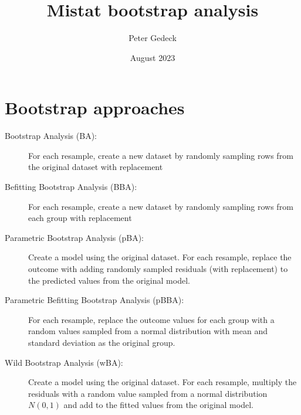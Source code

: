 \documentclass{article}
\title{Mistat bootstrap analysis}
\author{Peter Gedeck}
\date{August 2023}
\begin{document}
\maketitle

\section{Bootstrap approaches}
\begin{description}
    \item[Bootstrap Analysis (BA):] For each resample, create a new dataset by randomly sampling rows from the original dataset with replacement
    \item[Befitting Bootstrap Analysis (BBA):] For each resample, create a new dataset by randomly sampling rows from each group with replacement
    \item[Parametric Bootstrap Analysis (pBA):] Create a model using the original dataset. For each resample, replace the outcome with adding randomly sampled residuals (with replacement) to the predicted values from the original model.
    \item[Parametric Befitting Bootstrap Analysis (pBBA):] For each resample, replace the outcome values for each group with a random values sampled from a normal distribution with mean and standard deviation as the original group.
    \item[Wild Bootstrap Analysis (wBA):] Create a model using the original dataset. For each resample, multiply the residuals with a random value sampled from a normal distribution $N(0,1)$ and add to the fitted values from the original model.
\end{description}
\end{document}
